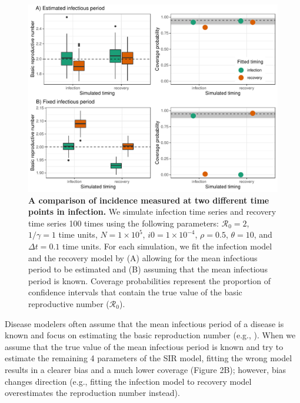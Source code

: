\documentclass[12pt]{article}\usepackage[]{graphicx}\usepackage[]{color}
\begin{document}
\begin{figure}
\includegraphics[width=\textwidth]{../figure/compare_deterministic.pdf}
\caption{
\textbf{A comparison of incidence measured at two different time points in infection.}
We simulate infection time series and recovery time series 100 times using the 
following parameters:  
$\mathcal R_0 = 2$, $1/\gamma = 1$ time units, $N = 1 \times 10^5$, $i0 = 1 \times 10^{-4}$,
$\rho = 0.5$, $\theta = 10$, and $\Delta t = 0.1$ time units.
For each simulation, we fit the infection model and the recovery model by
(A) allowing for the mean infectious period to be estimated and (B) assuming
that the mean infectious period is known.
Coverage probabilities represent the proportion of confidence intervals
that contain the true value of the basic reproductive number ($\mathcal R_0$).
}
\end{figure}

Disease modelers often assume that the mean infectious period of a disease
is known and focus on estimating the basic reproduction number (e.g.,
\cite{hooker2010parameterizing, lin2016seasonality, pons2018serotype}). 
When we assume that the true value of the mean infectious period is known
and try to estimate the remaining 4 parameters of the SIR model, fitting the
wrong model results in a clearer bias and a much lower coverage (Figure 2B); however, 
bias changes direction (e.g., fitting the infection
model to recovery model overestimates the reproduction number instead). 
\end{document}
